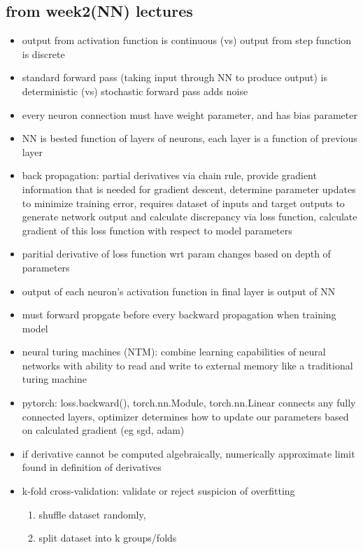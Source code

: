 \documentclass[10pt]{article}
\begin{document}
\subsection*{from week2(NN) lectures}
\begin{itemize}[label=\(\star\), leftmargin=1em, itemsep=-0.3em]
    \item output from activation function is continuous (vs) output from step function is discrete
    \item standard forward pass (taking input through NN to produce output) is deterministic (vs) stochastic forward pass adds noise
    \item every neuron connection must have weight parameter, and has bias parameter
    \item NN is bested function of layers of neurons, each layer is a function of previous layer
    \item back propagation: partial derivatives via chain rule, provide gradient information that is needed for gradient descent, determine parameter updates to minimize training error, requires dataset of inputs and target outputs to generate network output and calculate discrepancy via loss function, calculate gradient of this loss function with respect to model parameters
    \item paritial derivative of loss function wrt param changes based on depth of parameters
    \item output of each neuron's activation function in final layer is output of NN
    \item must forward propgate before every backward propagation when training model
    \item neural turing machines (NTM): combine learning capabilities of neural networks with ability to read and write to external memory like a traditional turing machine
    \item pytorch: loss.backward(), torch.nn.Module, torch.nn.Linear connects any fully connected layers, optimizer determines how to update our parameters based on calculated gradient (eg sgd, adam)
    \item if derivative cannot be computed algebraically, numerically approximate limit found in definition of derivatives
    \item k-fold cross-validation: validate or reject suspicion of overfitting
        \begin{enumerate}[leftmargin=1em, itemsep=-0.3em]
            \item shuffle dataset randomly,
            \item split dataset into k groups/folds

\end{enumerate}
\end{itemize}
\end{document}
